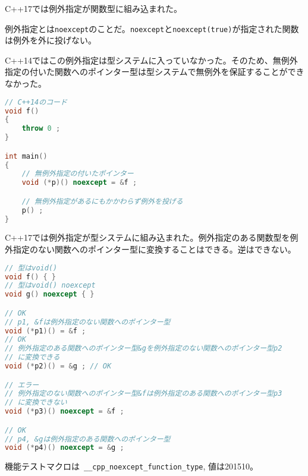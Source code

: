 %

C++17では例外指定が関数型に組み込まれた。

例外指定とは\lstinline!noexcept!のことだ。\lstinline!noexcept!と\lstinline!noexcept(true)!が指定された関数は例外を外に投げない。

C++14ではこの例外指定は型システムに入っていなかった。そのため、無例外指定の付いた関数へのポインター型は型システムで無例外を保証することができなかった。

\begin{lstlisting}[language=C++]
// C++14のコード
void f()
{
    throw 0 ; 
}

int main()
{
    // 無例外指定の付いたポインター
    void (*p)() noexcept = &f ;

    // 無例外指定があるにもかかわらず例外を投げる
    p() ;
}
\end{lstlisting}

C++17では例外指定が型システムに組み込まれた。例外指定のある関数型を例外指定のない関数へのポインター型に変換することはできる。逆はできない。

\begin{lstlisting}[language=C++]
// 型はvoid()
void f() { }
// 型はvoid() noexcept
void g() noexcept { }

// OK
// p1, &fは例外指定のない関数へのポインター型
void (*p1)() = &f ;
// OK
// 例外指定のある関数へのポインター型&gを例外指定のない関数へのポインター型p2
// に変換できる
void (*p2)() = &g ; // OK

// エラー
// 例外指定のない関数へのポインター型&fは例外指定のある関数へのポインター型p3
// に変換できない
void (*p3)() noexcept = &f ;

// OK
// p4, &gは例外指定のある関数へのポインター型
void (*p4)() noexcept = &g ;
\end{lstlisting}

機能テストマクロは~\lstinline!__cpp_noexcept_function_type!, 値は201510。
